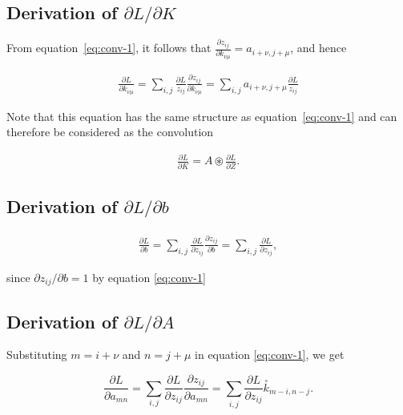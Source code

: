 \documentclass[a4paper,10pt]{article}
\begin{document}
\subsection*{Derivation of $\partial L / \partial K$}

From equation~\ref{eq:conv-1}, it follows that $\frac{\partial z_{ij}}{\partial k_{\nu\mu}} = a_{i + \nu, j + \mu}$, and hence

\begin{align*}
    \frac{\partial L}{\partial k_{\nu\mu}} = \sum_{i,j} 
    \frac{\partial L}{z_{ij}} \frac{\partial{z_{ij}}}{\partial k_{\nu\mu}} = \sum_{i,j} 
    a_{i + \nu, j + \mu}
    \frac{\partial L}{z_{ij}}
\end{align*}

Note that this equation has the same structure as equation~\ref{eq:conv-1} and can
therefore be considered as the convolution

\begin{align*}
    \frac{\partial L}{\partial K} = A \circledast \frac{\partial L}{\partial Z}.
\end{align*}

\subsection*{Derivation of $\partial L / \partial b$}

\begin{align*}
    \frac{\partial L}{\partial b} = \sum_{i,j} \frac{\partial L}{\partial z_{ij}} \frac{\partial z_{ij}}{\partial b} = \sum_{i,j} 
    \frac{\partial L}{\partial z_{ij}},
\end{align*}

since $\partial z_{ij} / \partial b = 1$ by equation \ref{eq:conv-1}

\subsection*{Derivation of $\partial L / \partial A$}

Substituting $m=i + \nu$ and $n = j + \mu$ in equation \ref{eq:conv-1}, we get 

\begin{equation}
    \label{eq:conv-2}
    \boxed{
        \frac{\partial L}{\partial a_{mn}} = \sum_{i,j}
        \frac{\partial L}{\partial z_{ij}} \frac{\partial z_{ij}}{\partial a_{mn}}      
        = \sum_{\substack{i,j}}
        \frac{\partial L}{\partial z_{ij}} \overset{\circ}{k}_{m-i, n-j}.
    }
\end{equation}
\end{document}

